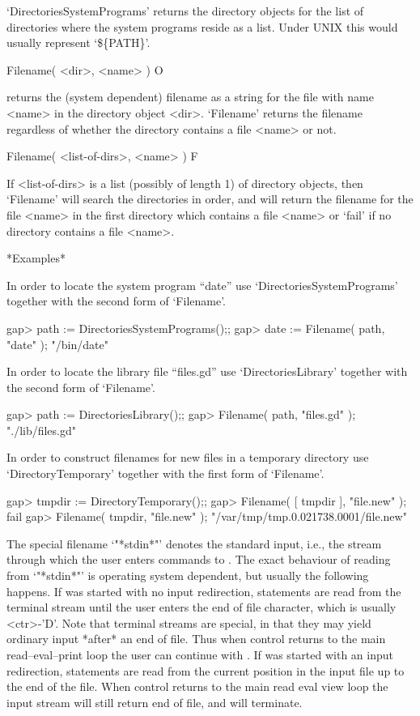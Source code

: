 `DirectoriesSystemPrograms' returns the directory objects for the list of
directories where  the system programs reside as a list.  Under UNIX this
would usually represent `\$\{PATH\}'.


\>Filename( <dir>, <name> ) O

returns the (system  dependent)  filename as  a string for  the file with
name   <name> in the  directory  object  <dir>.   `Filename' returns  the
filename regardless of  whether the directory contains  a file <name>  or
not.

\>Filename( <list-of-dirs>, <name> ) F

If <list-of-dirs> is a list (possibly  of length 1) of directory objects,
then `Filename' will search the directories in order, and will return the
filename for the file <name> in the first directory which contains a file
<name> or `fail' if no directory contains a file <name>.

*Examples*

In    order  to      locate   the    system   program    ``date''     use
`DirectoriesSystemPrograms' together with the second form of `Filename'.

\begintt
gap> path := DirectoriesSystemPrograms();;
gap> date := Filename( path, "date" );
"/bin/date"
\endtt

In order to locate the library file ``files.gd'' use `DirectoriesLibrary'
together with the second form of `Filename'.

\begintt
gap> path := DirectoriesLibrary();;
gap> Filename( path, "files.gd" );
"./lib/files.gd"
\endtt

In  order to construct filenames for  new  files in a temporary directory
use `DirectoryTemporary' together with the first form of `Filename'.

\begintt
gap> tmpdir := DirectoryTemporary();;
gap> Filename( [ tmpdir ], "file.new" );
fail
gap> Filename( tmpdir, "file.new" );    
"/var/tmp/tmp.0.021738.0001/file.new"
\endtt


The special filename `"*stdin*"'   denotes the standard input, i.e.,  the
stream   through  which the user enters  commands  to  {\GAP}.  The exact
behaviour of reading from `"*stdin*"' is  operating system dependent, but
usually   the  following happens.   If {\GAP} was started with  no  input
redirection, statements are read from  the terminal stream until the user
enters the end of file character, which  is usually <ctr>-'D'.  Note that
terminal streams  are  special, in   that they may  yield ordinary  input
*after* an end of file.
Thus when control returns to the main read--eval--print loop the user can
continue with {\GAP}.
If {\GAP} was started with an input redirection, statements are read from
the current position in  the input file up to the  end of the file.
When control returns to the main read eval view loop the input stream
will still return end of file, and {\GAP} will terminate.

